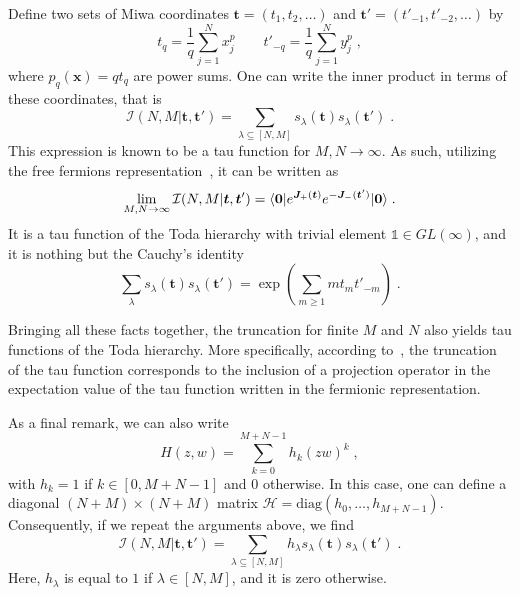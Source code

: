 \documentclass[a4paper,11pt]{amsart}
\begin{document}
Define two sets of Miwa coordinates \(\bm{t} = (t_1, t_2, \dots)\) and
\(\bm{t}' = (t'_{-1}, t'_{-2}, \dots)\) by
\begin{equation}
  t_q = \frac{1}{q}\sum_{j=1}^N x_j^p\qquad 
  t'_{-q} = \frac{1}{q}\sum_{j=1}^N y_j^p\; , 
\end{equation}
where \(p_q(\bm{x}) = q t_q\) are power sums. One can write the inner
product in terms of these coordinates, that is
\begin{equation}
  \mathcal{I}(N, M|\bm{t}, \bm{t}') = \sum_{\lambda\subseteq [N,M]} s_\lambda(\bm{t}) s_\lambda(\bm{t}') \; .
\end{equation}
This expression is known to be a tau function for \(M, N\to \infty\).
As such, utilizing the free fermions representation~\cite{Alexandrov:2012tr}, it can be written as
\begin{equation}
  \lim_{M,N\to \infty}\mathcal{I}(N, M|\bm{t}, \bm{t}')
 = \langle\bm{0}\rvert e^{\bm{J}_+(\bm{t})} e^{-\bm{J}_-(\bm{t}')} \lvert\bm{0}\rangle\; .
\end{equation}
It is a tau function of the Toda hierarchy with trivial element
\(\mathbb{1} \in GL(\infty)\), and it is nothing but the Cauchy's
identity
\begin{equation}
  \sum_{\lambda } s_{\lambda}(\bm{t}) s_{\lambda}(\bm{t}')
    = \exp \left( \sum_{m\geq1} m t_m t'_{-m} \right) \; .
\end{equation}

Bringing all these facts together, the truncation for finite \(M\) and
\(N\) also yields tau functions of the Toda hierarchy. More
specifically, according to~\cite{Alexandrov:2012tr, Kharchev:1991gd,
  Zabrodin:2010ii}, the truncation of the tau function corresponds to
the inclusion of a projection operator in the expectation value of the
tau function written in the fermionic representation.

As a final remark, we can also write
\begin{equation}
  H(z,w) = \sum_{k=0}^{M+N-1} h_k(zw)^{k} \; , 
\end{equation}
with \(h_k=1\) if \(k\in [0, M+N-1]\) and \(0\) otherwise. In this
case, one can define a diagonal \((N+M)\times (N+M)\) matrix
\(\mathcal{H} = \textrm{diag}(h_0, \dots, h_{M+N-1})\). Consequently,
if we repeat the arguments above, we find
\begin{equation}
\mathcal{I}(N, M|\bm{t}, \bm{t}') = \sum_{\lambda \subseteq [N,M]} h_\lambda s_\lambda(\bm{t}) s_\lambda(\bm{t}') \; .
\end{equation}
Here, \(h_\lambda\) is equal to \(1\) if \(\lambda \in [N,M]\), and it
is zero otherwise.
\end{document}
